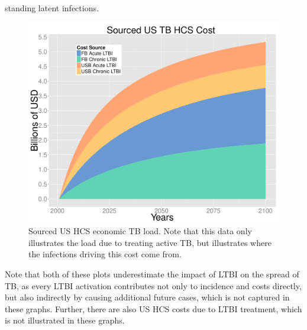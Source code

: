 \documentclass{amsart}
\begin{document}
standing latent infections. 
\begin{figure}[h]
  \begin{center}
    \includegraphics[scale=.35]{costPlotSourced}
  \end{center}
  \caption{Sourced US HCS economic TB load. Note that this data only illustrates
    the load due to treating active TB, but illustrates where the infections
    driving this cost come from.}
  \label{fig:costPlotSourced}
\end{figure}
Note that both of these plots underestimate the impact of LTBI on the spread of
TB, as every LTBI activation contributes not only
to incidence and costs directly, but also indirectly by causing additional
future cases, which is not captured in these graphs. Further, there are also US
HCS costs due to LTBI treatment, which is not illustrated in these graphs. 
\end{document}
